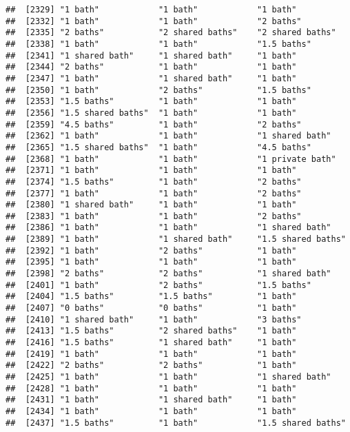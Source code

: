 \documentclass[
]{article}
\begin{document}
\begin{verbatim}
##  [2329] "1 bath"            "1 bath"            "1 bath"           
##  [2332] "1 bath"            "1 bath"            "2 baths"          
##  [2335] "2 baths"           "2 shared baths"    "2 shared baths"   
##  [2338] "1 bath"            "1 bath"            "1.5 baths"        
##  [2341] "1 shared bath"     "1 shared bath"     "1 bath"           
##  [2344] "2 baths"           "1 bath"            "1 bath"           
##  [2347] "1 bath"            "1 shared bath"     "1 bath"           
##  [2350] "1 bath"            "2 baths"           "1.5 baths"        
##  [2353] "1.5 baths"         "1 bath"            "1 bath"           
##  [2356] "1.5 shared baths"  "1 bath"            "1 bath"           
##  [2359] "4.5 baths"         "1 bath"            "2 baths"          
##  [2362] "1 bath"            "1 bath"            "1 shared bath"    
##  [2365] "1.5 shared baths"  "1 bath"            "4.5 baths"        
##  [2368] "1 bath"            "1 bath"            "1 private bath"   
##  [2371] "1 bath"            "1 bath"            "1 bath"           
##  [2374] "1.5 baths"         "1 bath"            "2 baths"          
##  [2377] "1 bath"            "1 bath"            "2 baths"          
##  [2380] "1 shared bath"     "1 bath"            "1 bath"           
##  [2383] "1 bath"            "1 bath"            "2 baths"          
##  [2386] "1 bath"            "1 bath"            "1 shared bath"    
##  [2389] "1 bath"            "1 shared bath"     "1.5 shared baths" 
##  [2392] "1 bath"            "2 baths"           "1 bath"           
##  [2395] "1 bath"            "1 bath"            "1 bath"           
##  [2398] "2 baths"           "2 baths"           "1 shared bath"    
##  [2401] "1 bath"            "2 baths"           "1.5 baths"        
##  [2404] "1.5 baths"         "1.5 baths"         "1 bath"           
##  [2407] "0 baths"           "0 baths"           "1 bath"           
##  [2410] "1 shared bath"     "1 bath"            "3 baths"          
##  [2413] "1.5 baths"         "2 shared baths"    "1 bath"           
##  [2416] "1.5 baths"         "1 shared bath"     "1 bath"           
##  [2419] "1 bath"            "1 bath"            "1 bath"           
##  [2422] "2 baths"           "2 baths"           "1 bath"           
##  [2425] "1 bath"            "1 bath"            "1 shared bath"    
##  [2428] "1 bath"            "1 bath"            "1 bath"           
##  [2431] "1 bath"            "1 shared bath"     "1 bath"           
##  [2434] "1 bath"            "1 bath"            "1 bath"           
##  [2437] "1.5 baths"         "1 bath"            "1.5 shared baths" 

\end{verbatim}
\end{document}
